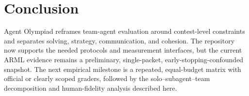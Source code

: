 \section{Conclusion}
Agent Olympiad reframes team-agent evaluation around contest-level constraints
and separates solving, strategy, communication, and cohesion. The repository
now supports the needed protocols and measurement interfaces, but the current
ARML evidence remains a preliminary, single-packet, early-stopping-confounded
snapshot. The next empirical milestone is a repeated, equal-budget matrix with
official or clearly scoped graders, followed by the solo--subagent--team
decomposition and human-fidelity analysis described here.
